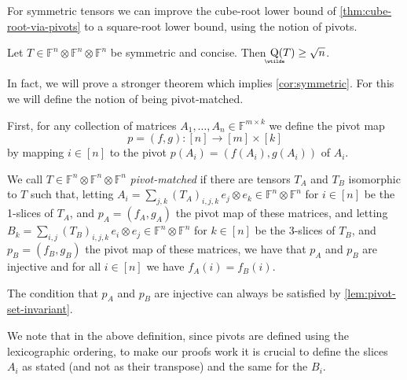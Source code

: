 \documentclass{daj}
\DeclareMathOperator{\asympsubrank}{\underaccent{\wtilde}{Q}}
\newcommand{\FF}{\mathbb{F}}
\begin{document}
For symmetric tensors we can improve the cube-root lower bound of \autoref{thm:cube-root-via-pivots} to a square-root lower bound, using the notion of pivots.

%

%

%
\begin{theorem}\label{cor:symmetric}
    Let $T \in \FF^{n} \otimes \FF^n \otimes\FF^n$ be symmetric and concise. Then  $\asympsubrank(T) \geq \sqrt{n}$.
\end{theorem}

In fact, we will prove a stronger theorem which implies \autoref{cor:symmetric}. For this we will define the notion of being pivot-matched.
%

First, for any collection of matrices $A_1, \ldots, A_n \in \FF^{m \times k}$ we define the pivot map 
\[
p = (f,g) : [n] \to [m] \times [k]
\]
by mapping $i\in [n]$ to the pivot $p(A_i) = (f(A_i), g(A_i))$ of $A_i$.
%

%

%

%

\begin{definition} \label{def:pivot-matched}
    We call $T\in\FF^{n}\otimes\FF^{n}\otimes\FF^{n}$ \emph{pivot-matched} if there are tensors $T_A$ and $T_B$ isomorphic 
    to $T$ such that, 
%
    letting $A_i = \sum_{j,k} (T_A)_{i,j,k}\, e_j \otimes e_k \in \FF^{n} \otimes \FF^{n}$ for $i \in [n]$ be the 1-slices of $T_A$, and $p_A=(f_A,g_A)$ the pivot map of these matrices, and
    letting $B_k = \sum_{i,j} (T_B)_{i,j,k}\, e_i \otimes e_j \in \FF^{n}\otimes \FF^{n}$ for $k \in [n]$ be the 3-slices of $T_B$, and $p_B=(f_B,g_B)$ the pivot map of these matrices, we have that $p_A$ and $p_B$ are injective and  for all $i \in [n]$ we have $f_A(i)=f_B(i)$.
%
%
%
%
%
\end{definition}

The condition that $p_A$ and $p_B$ are injective can always be satisfied by \autoref{lem:pivot-set-invariant}.

We note that in the above definition, since pivots are defined using the lexicographic ordering, to make our proofs work it is crucial to define the slices $A_i$ as stated (and not as their transpose) and the same for the $B_i$.

%



%
%
%
%
\end{document}

